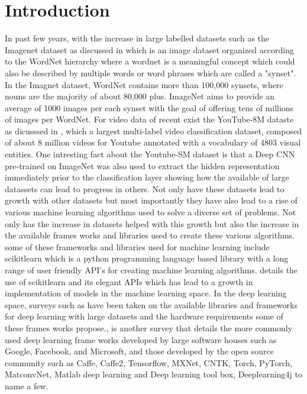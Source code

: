 \documentclass[10pt,phd,a4paper,oneside]{article}
\begin{document}
    \section{Introduction}
    In past few years, with the increase in large labelled datasets such as the Imagenet dataset as discussed in \citep{JiaDeng2009IAlh} which is an image dataset organized according to the WordNet hierarchy where a wordnet is a meaningful concept which could also be described by multiple words or word phrases which are called a "synset". In the Imagnet dataset, WordNet contains more than 100,000 synsets, where nouns are the majority of about 80,000 plus. ImageNet aims to provide an average of 1000 images per each synset with the goal of offering tens of millions of images per WordNet. For video data of recent exist the YouTube-8M dataste as dicusssed in \citep{45619}, which a largest multi-label video classification dataset, composed of about 8 million videos for Youtube annotated with a vocabulary of 4803 visual entities. One intresting fact about the Youtube-SM dataset is that a Deep CNN pre-trained on ImageNet was also used to extract the hidden representation immediately prior to the classification layer showing how the available of large datassets can lead to progress in others. Not only have these datasets lead to growth with other datasets but most importantly they have also lead to a rise of various machine learning algorithms used to solve a diverse set of problems. Not only has the increase in datasets helped with this growth but also the increase in the available frames works and libraries used to create these various algorithms. some of these frameworks and libraries used for machine learning include scikitlearn which is a python programming language based library with a long range of user friendly API's for creating machine learning algorithms. \citep{DBLP:journals/corr/BuitinckLBPMGNPGGLVJHV13} details the use of scikitlearn and its elegant APIs which has lead to a growth in implementation of models in the machine learning space. In the deep learning space, surveys such as \citep{Nguyen2019} have been taken on the available libraries and frameworks for deep learning with large datasets and the hardware requirements some of these frames works propose.\citep{Wang2019}, is another survey that details the more commonly used deep learning frame works developed by large software houses such as Google, Facebook, and Microsoft, and those developed by the open source community such as Caffe, Caffe2, Tensorflow, MXNet, CNTK, Torch, PyTorch,  MatconvNet, Matlab deep learning and Deep learning tool box, Deeplearning4j to name a few.
\end{document}
